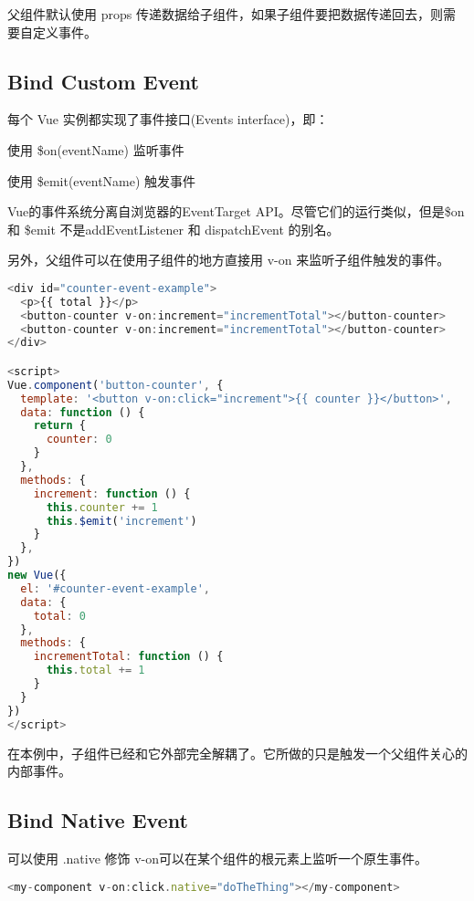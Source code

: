 父组件默认使用 props 传递数据给子组件，如果子组件要把数据传递回去，则需要自定义事件。


\subsection{Bind Custom Event}

每个 Vue 实例都实现了事件接口(Events interface)，即：

\begin{compactitem}
\item 使用 \$on(eventName) 监听事件
\item 使用 \$emit(eventName) 触发事件
\end{compactitem}

Vue的事件系统分离自浏览器的EventTarget API。尽管它们的运行类似，但是\$on 和 \$emit 不是addEventListener 和 dispatchEvent 的别名。

另外，父组件可以在使用子组件的地方直接用 v-on 来监听子组件触发的事件。

\begin{lstlisting}[language=JavaScript]
<div id="counter-event-example">
  <p>{{ total }}</p>
  <button-counter v-on:increment="incrementTotal"></button-counter>
  <button-counter v-on:increment="incrementTotal"></button-counter>
</div>

<script>
Vue.component('button-counter', {
  template: '<button v-on:click="increment">{{ counter }}</button>',
  data: function () {
    return {
      counter: 0
    }
  },
  methods: {
    increment: function () {
      this.counter += 1
      this.$emit('increment')
    }
  },
})
new Vue({
  el: '#counter-event-example',
  data: {
    total: 0
  },
  methods: {
    incrementTotal: function () {
      this.total += 1
    }
  }
})
</script>
\end{lstlisting}

在本例中，子组件已经和它外部完全解耦了。它所做的只是触发一个父组件关心的内部事件。

\subsection{Bind Native Event}


可以使用 .native 修饰 v-on可以在某个组件的根元素上监听一个原生事件。


\begin{lstlisting}[language=JavaScript]
<my-component v-on:click.native="doTheThing"></my-component>
\end{lstlisting}

